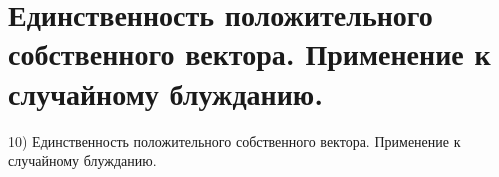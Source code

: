 \section{
 Единственность положительного собственного вектора. Применение к случайному блужданию.
}

10) Единственность положительного собственного вектора. Применение к случайному блужданию.
